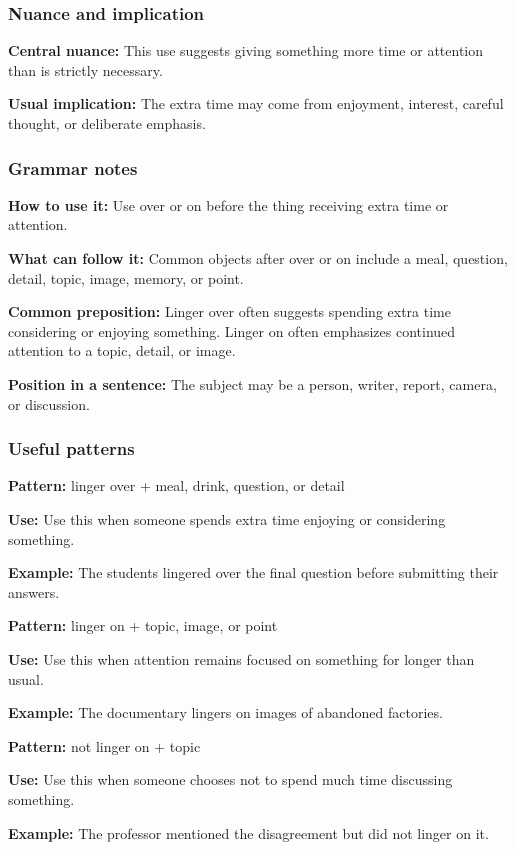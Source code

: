 \documentclass[11pt]{article}
\begin{document}
\subsubsection{Nuance and implication}
\textbf{Central nuance:} This use suggests giving something more time or attention than is strictly necessary.

\textbf{Usual implication:} The extra time may come from enjoyment, interest, careful thought, or deliberate emphasis.

\subsubsection{Grammar notes}
\textbf{How to use it:} Use over or on before the thing receiving extra time or attention.

\textbf{What can follow it:} Common objects after over or on include a meal, question, detail, topic, image, memory, or point.

\textbf{Common preposition:} Linger over often suggests spending extra time considering or enjoying something. Linger on often emphasizes continued attention to a topic, detail, or image.

\textbf{Position in a sentence:} The subject may be a person, writer, report, camera, or discussion.

\subsubsection{Useful patterns}
\textbf{Pattern:} linger over + meal, drink, question, or detail

\textbf{Use:} Use this when someone spends extra time enjoying or considering something.

\textbf{Example:} The students lingered over the final question before submitting their answers.

\textbf{Pattern:} linger on + topic, image, or point

\textbf{Use:} Use this when attention remains focused on something for longer than usual.

\textbf{Example:} The documentary lingers on images of abandoned factories.

\textbf{Pattern:} not linger on + topic

\textbf{Use:} Use this when someone chooses not to spend much time discussing something.

\textbf{Example:} The professor mentioned the disagreement but did not linger on it.
\end{document}
